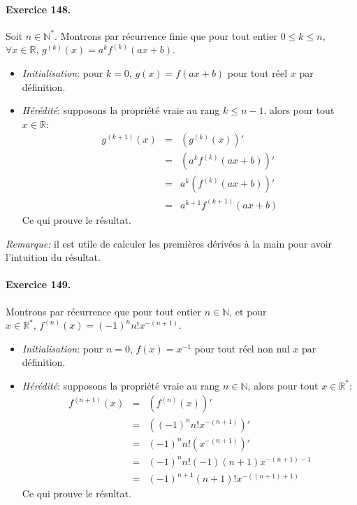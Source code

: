 \paragraph{Exercice 148.} Soit $n \in \mathbb{N}^*$. Montrons par récurrence finie que pour tout entier $0 \leq k \leq n$, $\forall x\in \mathbb{R}, \, g^{(k)}(x)=a^kf^{(k)}(ax+b)$.
\begin{itemize}
  \item \textit{Initialisation}: pour $k=0$, $g(x)=f(ax+b)$ pour tout réel $x$ par définition.
  \item \textit{Hérédité}: supposons la propriété vraie au rang $k \leq n-1$, alors pour tout $x \in \mathbb{R}$:
  \begin{eqnarray}
    g^{(k+1)}(x) &=& \left( g^{(k)}(x) \right)'  \nonumber \\
                &=& \left( a^kf^{(k)}(ax+b) \right)'  \nonumber \\
                &=& a^k \left( f^{(k)}(ax+b) \right)'  \nonumber \\
                &=& a^{k+1} f^{(k+1)}(ax+b)  \nonumber 
  \end{eqnarray}
  Ce qui prouve le résultat.
\end{itemize}

\textit{Remarque:} il est utile de calculer les premières dérivées à la main pour avoir l'intuition du résultat.

\paragraph{Exercice 149.} Montrons par récurrence que pour tout entier $n\in \mathbb{N}$, et pour $x\in \mathbb{R}^*, \, f^{(n)}(x)=(-1)^nn!x^{-(n+1)}$.
\begin{itemize}
  \item \textit{Initialisation}: pour $n=0$, $f(x)=x^{-1}$ pour tout réel non nul $x$ par définition.
  \item \textit{Hérédité}: supposons la propriété vraie au rang $n\in \mathbb{N}$, alors pour tout $x \in \mathbb{R}^*$:
  \begin{eqnarray}
    f^{(n+1)}(x) &=& \left( f^{(n)}(x) \right)'  \nonumber \\
                &=& \left( (-1)^nn!x^{-(n+1)} \right)'  \nonumber \\
                &=& (-1)^nn! \left( x^{-(n+1)} \right)'  \nonumber \\
                &=& (-1)^nn!(-1)(n+1) x^{-(n+1)-1} \nonumber \\
                &=& (-1)^{n+1}(n+1)!x^{-((n+1)+1)} \nonumber 
  \end{eqnarray}
  Ce qui prouve le résultat.
\end{itemize}

